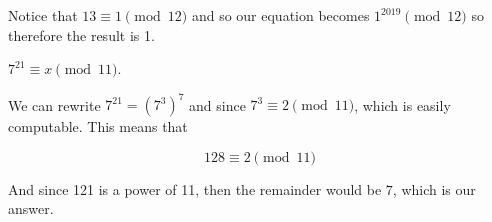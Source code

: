 \documentclass[11pt]{article}
\begin{document}
\begin{Parts}
\begin{solution}
  Notice that $13 \equiv 1 \pmod {12}$ and so our equation becomes $1^{2019} \pmod {12}$ so therefore the result is 1.
\end{solution}
\Part $7^{21} \equiv x \pmod{11}$.

\begin{solution}
  We can rewrite $7^{21} = \left(7^{3}\right)^7$ and since $7^3 \equiv 2 \pmod{11}$, which is easily computable. This means that 

  \[ 128 \equiv 2 \pmod {11}\]

  And since 121 is a power of 11, then the remainder would be $7$, which is our answer.
\end{solution}

\end{Parts}
\pagebreak
{}
\end{document}
